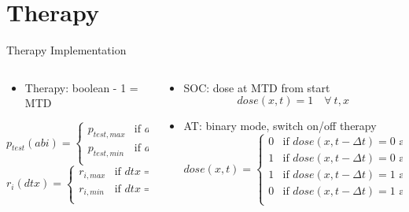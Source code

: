 \section{Therapy}

\begin{frame}{Therapy Implementation}
  \begin{columns}
    \begin{column}{0.4\textwidth}
      \begin{itemize}
        \item Therapy: boolean - 1 = MTD
      \end{itemize}
      \begin{equation}
        p_{test}(abi) = \begin{cases}
        p_{test,max} &\text{if } abi = 0 \\
        p_{test,min} &\text{if } abi = 1 \\
        \end{cases}
        \label{p_test_dose_eq}
      \end{equation}
      \begin{equation}
        r_i(dtx) = \begin{cases}
        r_{i,max} &\text{if } dtx = 0 \\
        r_{i,min} &\text{if } dtx = 1 \\
        \end{cases}
        \label{r_dose_eq}
      \end{equation}
    \end{column}
    \begin{column}{0.6\textwidth}
      \begin{itemize}
        \item SOC: dose at MTD from start
        \begin{equation}
          dose(x,t) = 1 \quad \forall\ t, x
          \label{dose_soc_eq}
        \end{equation}
        \item AT: binary mode, switch on/off therapy
        \begin{equation}
          dose(x,t) = \begin{cases}
          0 &\text{if } dose(x,t-\Delta t) = 0 \text{ and } x < \text{On} \\
          1 &\text{if } dose(x,t-\Delta t) = 0 \text{ and } x \geq \text{On} \\
          1 &\text{if } dose(x,t-\Delta t) = 1 \text{ and } x > \text{Off} \\
          0 &\text{if } dose(x,t-\Delta t) = 1 \text{ and } x \leq \text{Off} \\
          \end{cases}
          \label{dose_at_eq}
        \end{equation}
      \end{itemize}
    \end{column}
  \end{columns}
\end{frame}

